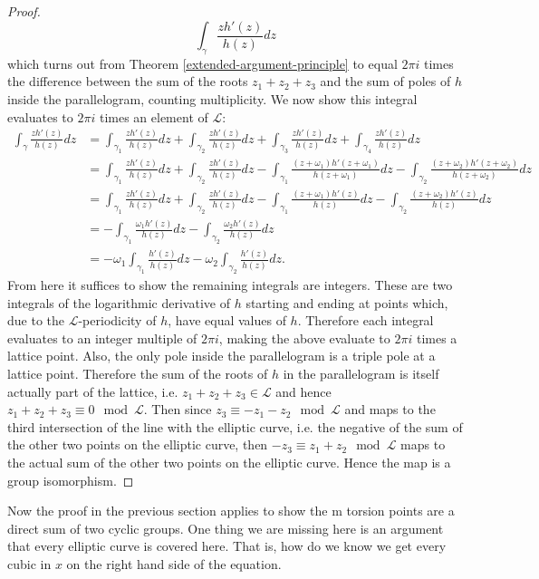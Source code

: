\documentclass{article}
\theoremstyle{definition}
\theoremstyle{definition}
\theoremstyle{definition}
\begin{document}
\begin{proof}
$$\int_\gamma \frac{zh'(z)}{h(z)}dz$$
which turns out from Theorem \ref{extended-argument-principle} to equal $2\pi i$ times the difference between the sum of the roots $z_1+z_2+z_3$ and the sum of poles of $h$ inside the parallelogram, counting multiplicity. We now show this integral evaluates to $2\pi i$ times an element of $\mathcal{L}$:
{\tiny
\begin{align*}
\int_\gamma \frac{zh'(z)}{h(z)}dz&=\int_{\gamma_1} \frac{zh'(z)}{h(z)}dz+\int_{\gamma_2} \frac{zh'(z)}{h(z)}dz+\int_{\gamma_3} \frac{zh'(z)}{h(z)}dz+\int_{\gamma_4} \frac{zh'(z)}{h(z)}dz\\
&=\int_{\gamma_1} \frac{zh'(z)}{h(z)}dz+\int_{\gamma_2} \frac{zh'(z)}{h(z)}dz-\int_{\gamma_1} \frac{(z+\omega_1)h'(z+\omega_1)}{h(z+\omega_1)}dz-\int_{\gamma_2} \frac{(z+\omega_2)h'(z+\omega_2)}{h(z+\omega_2)}dz\\
&=\int_{\gamma_1} \frac{zh'(z)}{h(z)}dz+\int_{\gamma_2} \frac{zh'(z)}{h(z)}dz-\int_{\gamma_1} \frac{(z+\omega_1)h'(z)}{h(z)}dz-\int_{\gamma_2} \frac{(z+\omega_2)h'(z)}{h(z)}dz\\
&=-\int_{\gamma_1} \frac{\omega_1h'(z)}{h(z)}dz-\int_{\gamma_2} \frac{\omega_2h'(z)}{h(z)}dz\\
&=-\omega_1\int_{\gamma_1} \frac{h'(z)}{h(z)}dz-\omega_2\int_{\gamma_2} \frac{h'(z)}{h(z)}dz.
\end{align*}
}
From here it suffices to show the remaining integrals are integers. These are two integrals of the logarithmic derivative of $h$ starting and ending at points which, due to the $\mathcal L$-periodicity of $h$, have equal values of $h$. Therefore each integral evaluates to an integer multiple of $2\pi i$, making the above evaluate to $2\pi i$ times a lattice point. Also, the only pole inside the parallelogram is a triple pole at a lattice point. Therefore the sum of the roots of $h$ in the parallelogram is itself actually part of the lattice, i.e. $z_1+z_2+z_3\in\mathcal L$ and hence $z_1+z_2+z_3\equiv0\mod\mathcal L$. Then since $z_3\equiv-z_1-z_2\mod\mathcal L$ and maps to the third intersection of the line with the elliptic curve, i.e. the negative of the sum of the other two points on the elliptic curve, then $-z_3\equiv z_1+z_2\mod\mathcal L$ maps to the actual sum of the other two points on the elliptic curve. Hence the map is a group isomorphism.
\end{proof}

Now the proof in the previous section applies to show the m torsion points are a direct sum of two cyclic groups. One thing we are missing here is an argument that every elliptic curve is covered here. That is, how do we know we get every cubic in $x$ on the right hand side of the equation.
\end{document}
